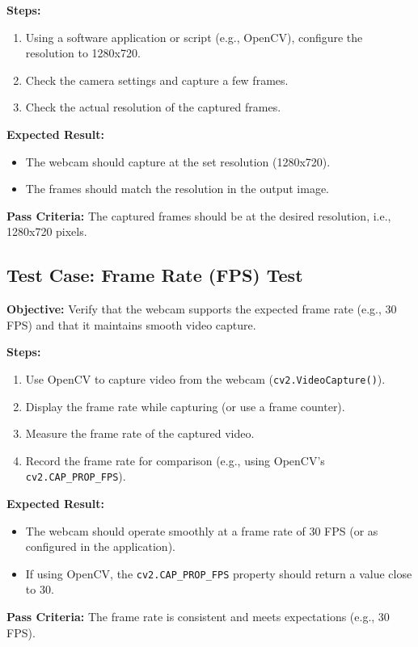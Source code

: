 \textbf{Steps:}
\begin{enumerate}
	\item Using a software application or script (e.g., OpenCV), configure the resolution to 1280x720.
	\item Check the camera settings and capture a few frames.
	\item Check the actual resolution of the captured frames.
\end{enumerate}

\textbf{Expected Result:}
\begin{itemize}
	\item The webcam should capture at the set resolution (1280x720).
	\item The frames should match the resolution in the output image.
\end{itemize}

\textbf{Pass Criteria:} 
The captured frames should be at the desired resolution, i.e., 1280x720 pixels. \cite{Renotte:2021}

\subsection{Test Case: Frame Rate (FPS) Test}
\textbf{Objective:} Verify that the webcam supports the expected frame rate (e.g., 30 FPS) and that it maintains smooth video capture.

\textbf{Steps:}
\begin{enumerate}
	\item Use OpenCV to capture video from the webcam (\texttt{cv2.VideoCapture()}).
	\item Display the frame rate while capturing (or use a frame counter).
	\item Measure the frame rate of the captured video.
	\item Record the frame rate for comparison (e.g., using OpenCV's \texttt{cv2.CAP\_PROP\_FPS}).
\end{enumerate}

\textbf{Expected Result:}
\begin{itemize}
	\item The webcam should operate smoothly at a frame rate of 30 FPS (or as configured in the application).
	\item If using OpenCV, the \texttt{cv2.CAP\_PROP\_FPS} property should return a value close to 30.
\end{itemize}

\textbf{Pass Criteria:} 
The frame rate is consistent and meets expectations (e.g., 30 FPS).

